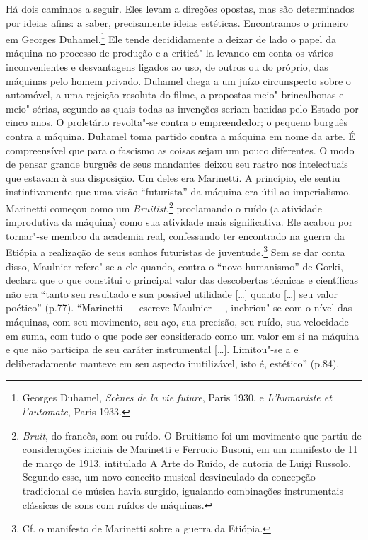 Há dois caminhos a seguir. Eles levam a direções opostas, mas são
determinados por ideias afins: a saber, precisamente ideias estéticas.
Encontramos o primeiro em Georges Duhamel.\footnote{Georges
  Duhamel, \emph{Scènes de la vie future}, Paris 1930, e
  \emph{L'humaniste et l'automate}, Paris 1933. \versal{[N. A.]}} Ele tende
decididamente a deixar de lado o papel da máquina no processo de
produção e a criticá"-la levando em conta os vários inconvenientes e
desvantagens ligados ao uso, de outros ou do próprio, das máquinas pelo
homem privado. Duhamel chega a um juízo circunspecto sobre o automóvel,
a uma rejeição resoluta do filme, a propostas meio"-brincalhonas e
meio"-sérias, segundo as quais todas as invenções seriam banidas pelo
Estado por cinco anos. O proletário revolta"-se contra o empreendedor; o
pequeno burguês contra a máquina. Duhamel toma partido contra a máquina
em nome da arte. É compreensível que para o fascismo as coisas sejam um
pouco diferentes. O modo de pensar grande burguês de seus mandantes
deixou seu rastro nos intelectuais que estavam à sua disposição. Um
deles era Marinetti. A princípio, ele sentiu instintivamente que uma
visão ``futurista'' da máquina era útil ao imperialismo. Marinetti começou
como um \emph{Bruitist},\footnote{\emph{Bruit}, do francês, som ou
  ruído. O Bruitismo foi um movimento que partiu de considerações
  iniciais de Marinetti e Ferrucio Busoni, em um manifesto de 11 de
  março de 1913, intitulado A Arte do Ruído, de autoria de Luigi
  Russolo. Segundo esse, um novo conceito musical desvinculado da
  concepção tradicional de música havia surgido, igualando combinações
  instrumentais clássicas de sons com ruídos de máquinas. \versal{[N. E.]}} proclamando
o ruído (a atividade improdutiva da máquina) como sua atividade mais
significativa. Ele acabou por tornar"-se membro da academia real,
confessando ter encontrado na guerra da Etiópia a realização de seus
sonhos futuristas de juventude.\footnote{Cf. o manifesto de
  Marinetti sobre a guerra da Etiópia. \versal{[N. A.]}} Sem se dar conta disso,
Maulnier refere"-se a ele quando, contra o ``novo humanismo'' de Gorki,
declara que o que constitui o principal valor das descobertas técnicas e
científicas não era ``tanto seu resultado e sua possível utilidade
{[}\ldots{}{]} quanto {[}\ldots{}{]} seu valor poético'' (p.77). ``Marinetti ---
escreve Maulnier ---, inebriou"-se com o nível das máquinas, com seu
movimento, seu aço, sua precisão, seu ruído, sua velocidade --- em suma,
com tudo o que pode ser considerado como um valor em si na máquina e que
não participa de seu caráter instrumental {[}\ldots{}{]}. Limitou"-se a e
deliberadamente manteve em seu aspecto inutilizável, isto é, estético''
(p.84).

